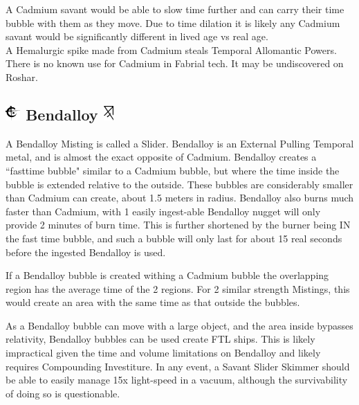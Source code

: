 \documentclass[conference]{IEEEtran}
\begin{document}
A Cadmium savant would be able to slow time further and can carry their time bubble with them as they move.  Due to time dilation it is likely any Cadmium savant would be significantly different in lived age vs real age.\\

A Hemalurgic spike made from Cadmium steals Temporal Allomantic Powers.\\

There is no known use for Cadmium in Fabrial tech.  It may be undiscovered on Roshar.

\subsection*{\includegraphics[height=1em]{images/Bendalloy.png}  Bendalloy \includegraphics[height=1em]{images/Bendalloy_(Feruchemy).png}}
A Bendalloy Misting is called a Slider.  Bendalloy is an External Pulling Temporal metal, and is almost the exact opposite of Cadmium.  Bendalloy creates a ``fasttime bubble" similar to a Cadmium bubble, but where the time inside the bubble is extended relative to the outside.  These bubbles are considerably smaller than Cadmium can create, about 1.5 meters in radius.  Bendalloy also burns much faster than Cadmium, with 1 easily ingest-able Bendalloy nugget will only provide 2 minutes of burn time.  This is further shortened by the burner being IN the fast time bubble, and such a bubble will only last for about 15 real seconds before the ingested Bendalloy is used.

If a Bendalloy bubble is created withing a Cadmium bubble the overlapping region has the average time of the 2 regions.  For 2 similar strength Mistings, this would create an area with the same time as that outside the bubbles.  

As a Bendalloy bubble can move with a large object, and the area inside bypasses relativity, Bendalloy bubbles can be used create FTL ships.  This is likely impractical given the time and volume limitations on Bendalloy and likely requires Compounding Investiture.
In any event, a Savant Slider Skimmer should be able to easily manage 15x light-speed in a vacuum, although the survivability of doing so is questionable.\\
\end{document}
